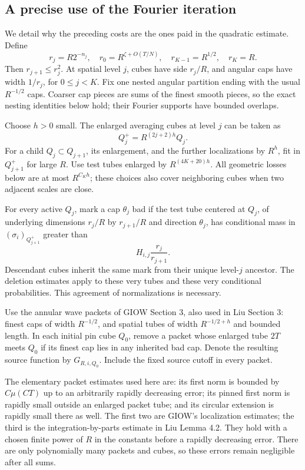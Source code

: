 \subsection{A precise use of the Fourier iteration}

We detail why the preceding costs are the ones paid in the quadratic estimate. Define
$$
 r_j=R2^{-n_j},\quad r_0=R^{\zeta+O(T/N)},\quad
 r_{K-1}=R^{1/2},\quad r_K=R.
$$
Then \(r_{j+1}\leq r_j^2\). At spatial level \(j\), cubes have side \(r_j/R\), and angular caps have width \(1/r_j\), for \(0\leq j<K\). Fix one nested angular partition ending with the usual \(R^{-1/2}\) caps. Coarser cap pieces are sums of the finest smooth pieces, so the exact nesting identities below hold; their Fourier supports have bounded overlaps.

Choose \(h>0\) small. The enlarged averaging cubes at level \(j\) can be taken as
$$
 Q_j^+=R^{(2j+2)h}Q_j.
$$
For a child \(Q_j\subset Q_{j+1}\), its enlargement, and the further localizations by \(R^h\), fit in \(Q_{j+1}^+\) for large \(R\). Use test tubes enlarged by \(R^{(4K+20)h}\). All geometric losses below are at most \(R^{C_Kh}\); these choices also cover neighboring cubes when two adjacent scales are close.

For every active \(Q_j\), mark a cap \(\theta_j\) bad if the test tube centered at \(Q_j\), of underlying dimensions \(r_j/R\) by \(r_{j+1}/R\) and direction \(\theta_j\), has conditional mass in \((\sigma_i)_{Q_{j+1}^+}\) greater than
$$
 H_{i,j}\frac{r_j}{r_{j+1}}.
$$
Descendant cubes inherit the same mark from their unique level-\(j\) ancestor. The deletion estimates apply to these very tubes and these very conditional probabilities. This agreement of normalizations is necessary.

Use the annular wave packets of GIOW Section 3, also used in Liu Section 3: finest caps of width \(R^{-1/2}\), and spatial tubes of width \(R^{-1/2+h}\) and bounded length. In each initial pin cube \(Q_0\), remove a packet whose enlarged tube \(2T\) meets \(Q_0\) if its finest cap lies in any inherited bad cap. Denote the resulting source function by \(G_{R,i,Q_0}\). Include the fixed source cutoff in every packet.

The elementary packet estimates used here are: its first norm is bounded by \(C\mu(CT)\) up to an arbitrarily rapidly decreasing error; its pinned first norm is rapidly small outside an enlarged packet tube; and its circular extension is rapidly small there as well. The first two are GIOW's localization estimates; the third is the integration-by-parts estimate in Liu Lemma 4.2. They hold with a chosen finite power of \(R\) in the constants before a rapidly decreasing error. There are only polynomially many packets and cubes, so these errors remain negligible after all sums.

